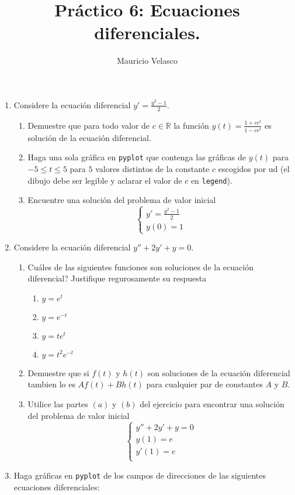 \documentclass[12pt, a4paper]{article}
\date{}
\begin{document}
\title{Pr\'actico 6: Ecuaciones diferenciales.}
\author{Mauricio Velasco}
\maketitle{}
\begin{enumerate}
\item Considere la ecuación diferencial $y'=\frac{y^2-1}{2}$.
\begin{enumerate}
\item Demuestre que para todo valor de $c\in \mathbb{R}$ la función $y(t)=\frac{1+ce^t}{1-ce^t}$ es solución de la ecuación diferencial.
\item Haga una sola gráfica en \verb!pyplot! que contenga las gráficas de  $y(t)$ para $-5\leq t\leq 5$ para $5$ valores distintos de la constante $c$ escogidos por ud (el dibujo debe ser legible y aclarar el valor de $c$ en \verb!legend!).
\item Encuentre una solución del problema de valor inicial
\[
\begin{cases}
y'=\frac{y^2-1}{2}\\
y(0)=1
\end{cases}
\]
\end{enumerate}
\item Considere la ecuación diferencial $y''+2y'+y=0$.
\begin{enumerate}
\item Cuáles de las siguientes funciones son soluciones de la ecuación diferencial? Justifique regurosamente su respuesta
\begin{enumerate}
\item $y=e^t$
\item $y=e^{-t}$
\item $y=te^t$
\item $y=t^2e^{-t}$
\end{enumerate}
\item Demuestre que si $f(t)$ y $h(t)$ son soluciones de la ecuación diferencial tambien lo es $Af(t)+Bh(t)$ para cualquier par de constantes $A$ y $B$.
\item Utilice las partes $(a)$ y $(b)$ del ejercicio para encontrar una solución del problema de valor inicial
\[
\begin{cases}
y''+2y'+y=0\\
y(1)=e\\
y'(1)=e\\
\end{cases}
\]
\end{enumerate}
\item Haga gráficas en \verb!pyplot! de los campos de direcciones de las siguientes ecuaciones diferenciales:


\end{enumerate}
\end{document}
